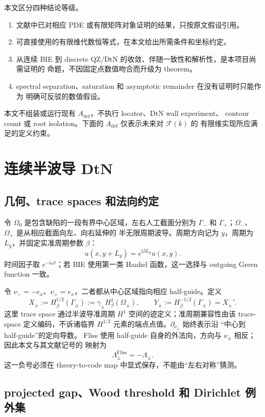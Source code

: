 \documentclass[UTF8,fontset=fandol,11pt,a4paper]{ctexart}
\newcommand{\ii}{\mathrm{i}}
\newcommand{\cF}{\mathcal F}
\begin{document}
本文区分四种结论等级。
\begin{enumerate}
  \item 文献中已对相应 PDE 或有限矩阵对象证明的结果，只按原文假设引用。
  \item 可直接使用的有限维代数恒等式，在本文给出所需条件和坐标约定。
  \item 从连续 BIE 到 discrete QZ/DtN 的收敛、伴随一致性和解析性，是本项目尚需证明的
  命题，不因固定点数值吻合而升级为 theorem。
  \item spectral separation、saturation 和 asymptotic remainder 在没有证明时只能作为
  明确可反驳的数值假设。
\end{enumerate}

本文不组装或运行现有 $A_{\mathrm{def}}$，不执行 locator、DtN wall experiment、
contour count 或 root isolation。下面的 $A_{\mathrm{def}}$ 仅表示未来对 $\cF(k)$ 的
有限维实现所应满足的定义约束。

\section{连续半波导 DtN}

\subsection{几何、trace spaces 和法向约定}

令 $\Omega_0$ 是包含缺陷的一段有界中心区域，左右人工截面分别为
$\Gamma_-$ 和 $\Gamma_+$；$\Omega_-$、$\Omega_+$ 是从相应截面向左、向右延伸的
半无限周期波导。周期方向记为 $y$，周期为 $L_y$，并固定实准周期参数 $\beta$：
\[
  u(x,y+L_y)=e^{\ii\beta L_y}u(x,y).
\]
时间因子取 $e^{-\ii\omega t}$；若 BIE 使用第一类 Hankel 函数，这一选择与 outgoing
Green function 一致。

令 $\nu_-=-e_x$、$\nu_+=e_x$，二者都从中心区域指向相应 half-guide。定义
\[
  X_\pm:=H_\beta^{1/2}(\Gamma_\pm)
  :=\gamma_\pm H_\beta^1(\Omega_\pm),
  \qquad
  Y_\pm:=H_\beta^{-1/2}(\Gamma_\pm)=X_\pm'.
\]
这里 trace space 通过半波导准周期 $H^1$ 空间的迹定义；准周期兼容性由该 trace-space
定义编码，不诉诸临界 $H^{1/2}$ 元素的端点点值。$\partial_{\nu_\pm}$ 始终表示沿
“中心到 half-guide”的定向导数。
Fliss 使用 half-guide 自身的外法向，方向与 $\nu_\pm$ 相反；因此本文与其文献记号的
映射为
\[
  \Lambda_\pm^{\mathrm{Fliss}}=-\Lambda_\pm.
\]
这一负号必须在 theory-to-code map 中显式保存，不能由“左右对称”猜测。

\subsection{projected gap、Wood threshold 和 Dirichlet 例外集}
\end{document}
